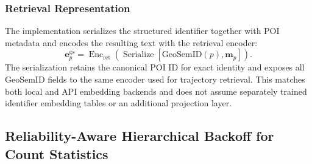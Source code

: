 \documentclass[journal]{IEEEtran}
\newcommand{\gsid}{\mathrm{GeoSemID}}
\begin{document}
\subsubsection{Retrieval Representation}

The implementation serializes the structured identifier together with POI
metadata and encodes the resulting text with the retrieval encoder:
\begin{equation}
\bm{e}_{p}^{\mathrm{gs}}
=
\operatorname{Enc}_{\mathrm{ret}}
\left(
\operatorname{Serialize}
\left[
\gsid(p),\bm{m}_p
\right]
\right).
\label{eq:geosemid_embedding}
\end{equation}
The serialization retains the canonical POI ID for exact identity and exposes
all GeoSemID fields to the same encoder used for trajectory retrieval. This
matches both local and API embedding backends and does not assume separately
trained identifier embedding tables or an additional projection layer.

\subsection{Reliability-Aware Hierarchical Backoff for Count Statistics}
\label{subsec:backoff}
\end{document}
